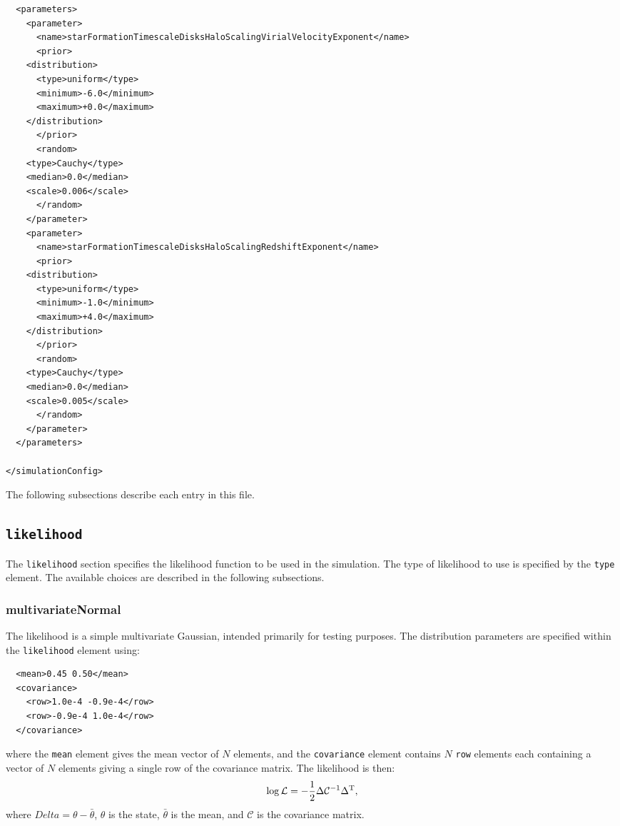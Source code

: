 \begin{verbatim}
  <parameters>
    <parameter>
      <name>starFormationTimescaleDisksHaloScalingVirialVelocityExponent</name>
      <prior>
	<distribution>
	  <type>uniform</type>
	  <minimum>-6.0</minimum>
	  <maximum>+0.0</maximum>
	</distribution>
      </prior>
      <random>
	<type>Cauchy</type>
	<median>0.0</median>
	<scale>0.006</scale>
      </random>
    </parameter>
    <parameter>
      <name>starFormationTimescaleDisksHaloScalingRedshiftExponent</name>
      <prior>
	<distribution>
	  <type>uniform</type>
	  <minimum>-1.0</minimum>
	  <maximum>+4.0</maximum>
	</distribution> 
      </prior>
      <random>
	<type>Cauchy</type>
	<median>0.0</median>
	<scale>0.005</scale>
      </random>
    </parameter>
  </parameters>
  
</simulationConfig>
\end{verbatim}

The following subsections describe each entry in this file.

\subsection{{\tt likelihood}}

The {\tt likelihood} section specifies the likelihood function to be used in the simulation. The type of likelihood to use is specified by the {\tt type} element. The available choices are described in the following subsections.

\subsubsection{multivariateNormal}

The likelihood is a simple multivariate Gaussian, intended primarily for testing purposes. The distribution parameters are specified within the {\tt likelihood} element using:
\begin{verbatim}
  <mean>0.45 0.50</mean>
  <covariance>
    <row>1.0e-4 -0.9e-4</row>
    <row>-0.9e-4 1.0e-4</row>
  </covariance>
\end{verbatim}
where the {\tt mean} element gives the mean vector of $N$ elements, and the {\tt covariance} element contains $N$ {\tt row} elements each containing a vector of $N$ elements giving a single row of the covariance matrix. The likelihood is then:
\begin{equation}
\log \mathcal{L} = - {1 \over 2} \Delta \mathcal{C}^{-1} \Delta^{\rm T},
\end{equation}
where $Delta = \theta - \bar{\theta}$, $\theta$ is the state, $\bar{\theta}$ is the mean, and $\mathcal{C}$ is the covariance matrix.

